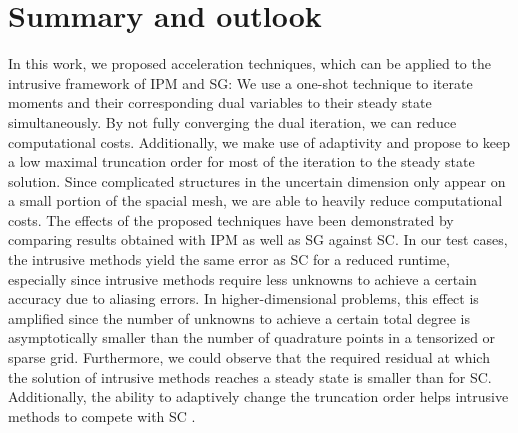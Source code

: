 \section{Summary and outlook}
\label{sec:summary_outlook}
In this work, we proposed acceleration techniques, which can be applied to the intrusive framework of IPM and SG: We use a one-shot technique to iterate moments and their corresponding dual variables to their steady state simultaneously. By not fully converging the dual iteration, we can reduce computational costs. Additionally, we make use of adaptivity and propose to keep a low maximal truncation order for most of the iteration to the steady state solution. Since complicated structures in the uncertain dimension only appear on a small portion of the spacial mesh, we are able to heavily reduce computational costs. The effects of the proposed techniques have been demonstrated by comparing results obtained with IPM as well as SG against SC. In our test cases, the intrusive methods yield the same error as SC for a reduced runtime, especially since intrusive methods require less unknowns to achieve a certain accuracy due to aliasing errors. In higher-dimensional problems, this effect is amplified since the number of unknowns to achieve a certain total degree is asymptotically smaller than the number of quadrature points in a tensorized or sparse grid. Furthermore, we could observe that the required residual at which the solution of intrusive methods reaches a steady state is smaller than for SC. Additionally, the ability to adaptively change the truncation order helps intrusive methods to compete with SC .

